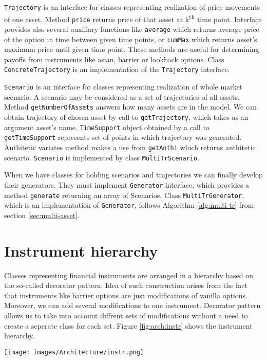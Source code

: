 \documentclass[a4paper,11pt, twoside]{book}
\theoremstyle{definition}
\theoremstyle{remark}
\begin{document}
\texttt{Trajectory} is an interface for classes representing realization of price movements of one asset. Method \texttt{price} returns price of that asset at k\textsuperscript{th} time point. Interface provides also several auxiliary functions like \texttt{average} which returns average price of the option in time between given time points, or \texttt{cumMax} which returns asset's maximum price until given time point. These methods are useful for determining payoffs from instruments like asian, barrier or lookback options. Class \texttt{ConcreteTrajectory} is an implementation of the \texttt{Trajectory} interface.

\texttt{Scenario} is an interface for classes representing realization of whole market scenario. A scenario may be considered as a set of trajectories of all assets. Method \texttt{getNumberOfAssets} answers how many assets are in the model. We can obtain trajectory of chosen asset by call to \texttt{getTrajectory}, which takes as an argument asset's name. \texttt{TimeSupport} object obtained by a call to \texttt{getTimeSupport} represents set of points in which trajectory was generated. Anthitetic variates method makes a use from \texttt{getAnthi} which returns anthitetic scenario. \texttt{Scenario} is implemented by class \texttt{MultiTrScenario}.

When we have classes for holding scenarios and trajectories we can finally develop their generators. They must implement \texttt{Generator} interface, which provides a method \texttt{generate} returning an array of Scenarios. Class \texttt{MultiTrGenerator}, which is an implementation of \texttt{Generator}, follows Algorithm \ref{alg:multi-tr} from section \ref{sec:multi-asset}.

\section{Instrument hierarchy}
Classes representing financial instruments are arranged in a hierarchy based on the so-called decorator pattern. Idea of such construction arises from the fact that instruments like barrier options are just modifications of vanilla options. Moreover, we can add several modifications to one instrument. Decorator pattern allows us to take into account diffrent sets of modifications without a need to create a seperate class for each set. Figure \ref{fig:arch:instr} shows the instrument hierarchy.
\begin{sidewaysfigure}
\centering
 \texttt{[image: images/Architecture/instr.png]}
\caption{Class diagram presenting hierarchy of financial instruments.}
\label{fig:arch:instr}
\end{sidewaysfigure}
\end{document}
